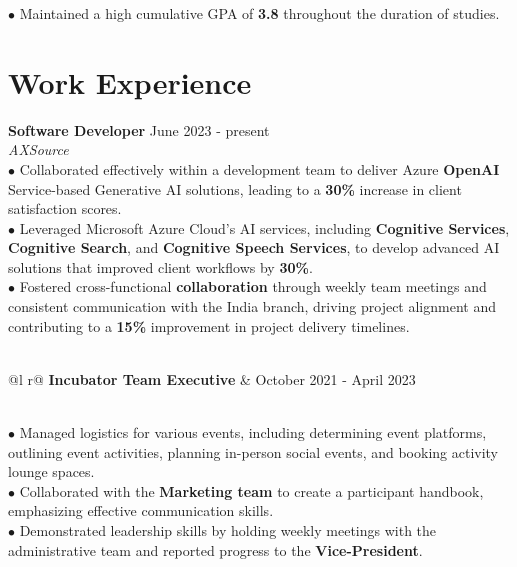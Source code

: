 \documentclass[letterpaper,12pt]{article}
\begin{document}
\hspace{0.3cm} $\bullet$ {\fontsize{10pt}{9pt}\selectfont Maintained a high cumulative GPA of \textbf{3.8} throughout the duration of studies.}

\section{Work Experience}

\textbf{Software Developer}  \hfill   June 2023 - present \\
\textit{AXSource} 
\vspace{0.3cm}
\\\hspace{0.1cm} $\bullet$ Collaborated effectively within a development team to deliver Azure \textbf{OpenAI} Service-based Generative AI solutions, leading to a \textbf{30\%} increase in client satisfaction scores.\\
\hspace{0.1cm} $\bullet$ \hspace{0.05cm}Leveraged Microsoft Azure Cloud's AI services, including \textbf{Cognitive Services}, \textbf{Cognitive Search}, and \textbf{Cognitive Speech Services}, to develop advanced AI solutions that improved client workflows by \textbf{30\%}. \\
\hspace{0.1cm} $\bullet$ \hspace{0.05cm} Fostered cross-functional \textbf{collaboration} through weekly team meetings and consistent communication with the India branch, driving project alignment and contributing to a \textbf{15\%} improvement in project delivery timelines. \\\\
\begin{tabularx}{\linewidth}{ @{}l r@{} }
    \textbf{Incubator Team Executive} &  \hfill \normalsize{October 2021 - April 2023} \\
\end{tabularx} 
\vspace{0.25cm} \\
\hspace{0.1cm} $\bullet$ Managed logistics for various events, including determining event platforms, outlining event activities, planning in-person social events, and booking activity lounge spaces. \\ 
\hspace{0.1cm} $\bullet$ \hspace{0.05cm}Collaborated with the \textbf{Marketing team} to create a participant handbook, emphasizing effective communication skills.\\
\hspace{0.1cm} $\bullet$ \hspace{0.03cm}Demonstrated leadership skills by holding weekly meetings with the administrative team and reported progress to the \textbf{Vice-President}.
\end{document}
